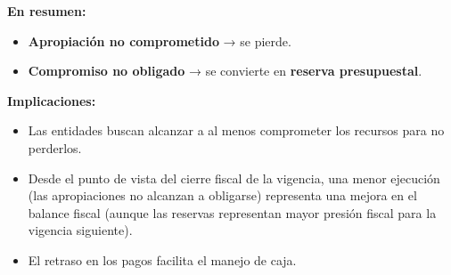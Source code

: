 \begin{frame}
\textbf{En resumen:}
\vspace{1em}
\begin{itemize}
  \item \textbf{Apropiación no comprometido} → se pierde.
  \item \textbf{Compromiso no obligado} → se convierte en \textbf{reserva presupuestal}.
\end{itemize}
\end{frame}



\begin{frame}
\vspace{1em}
\textbf{Implicaciones:}
\begin{itemize}
  \item Las entidades buscan alcanzar a al menos comprometer los recursos para no perderlos.
  \item Desde el punto de vista del cierre fiscal de la vigencia, una menor ejecución (las apropiaciones no alcanzan a obligarse) representa una mejora en el balance fiscal (aunque las reservas representan mayor presión fiscal para la vigencia siguiente).
  \item El retraso en los pagos facilita el manejo de caja.   
\end{itemize}

\end{frame}

